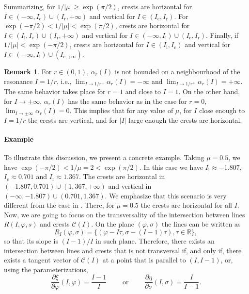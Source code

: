 \documentclass[a4paper,10pt]{article}
\newcommand{\NH}{\text{NHIM}}
\theoremstyle{definition}
\newtheorem{remark}[theorem]{Remark}
\begin{document}
Summarizing, for $1/\left|\mu\right| \geq \exp(\pi/2)$, crests are horizontal for $I\in\left(-\infty , I_{\text{c}}\right)\cup(I_{\text{r}} , +\infty)$ and vertical for $I\in\left(I_{\text{c}},I_{\text{r}}\right)$.
For $\exp(-\pi/2) < 1/\left|\mu\right| < \exp( \pi/2)$, crests are horizontal for $I\in(I_{\text{l}}, I_{\text{c}})\cup(I_{\text{r}} , +\infty)$ and vertical for $I\in(-\infty , I_{\text{l}})\cup(I_{\text{c}} , I_{\text{r}})$.
Finally, if $ 1/\left|\mu\right| < \exp( -\pi/2)$, crests are horizontal for $I\in(I_{\text{l}} , I_{\text{c}})$ and vertical for $I\in(-\infty , I_{\text{l}})\cup(I_{\text{c}, + \infty})$.

\begin{remark}
For $r\in (0,1)$, $\alpha_r(I)$ is not bounded on a neighbourhood of the resonance $I = 1/r$, i.e., $\lim_{I \rightarrow 1/r^{-}} \alpha_r(I) = -\infty $ and $\lim_{I\rightarrow 1/r^{+}}\alpha_r(I) = +\infty$.
The same behavior takes place for $r = 1$ and close to $I = 1$.
On the other hand, for $I\rightarrow \pm \infty$, $\alpha_r(I)$ has the same behavior as in the case for $r = 0$, $\lim_{I \rightarrow \pm\infty}\alpha_r(I) = 0$.
This implies that for any value of $\mu$, for $I$ close enough to $I = 1/r$ the crests are vertical, and for $\left|I\right| $ large enough the crests are horizontal. \label{rem:r_3}
\end{remark}

\paragraph{Example} To illustrate this discussion, we present a concrete example.
Taking $\mu = 0.5$,  we have $\exp(-\pi/2)< 1/\mu = 2<\exp(\pi/2)$.
In this case we have $I_{\text{l}}\approx -1.807$, $I_{\text{c}} \approx 0.701$ and $I_{\text{r}} \approx 1.367$.
The crests are horizontal in $(-1.807 , 0.701)\cup(1,367 , + \infty)$ and vertical in $(-\infty , -1.807)\cup( 0.701 , 1.367 )$.
We emphasize that this scenario is very different from the case in \cite{Delshams2017}.
There, for $\mu = 0.5$ the crests are horizontal for all $I$.
\\

Now, we are going to focus on the transversality of the intersection between {\NH} lines $R(I,\varphi , s)$ and crests $\mathcal{C}(I)$.
On the plane $(\varphi , \sigma)$ the {\NH} lines can be written as
\begin{equation}
R_{I}(\varphi, \sigma) = \{( \varphi - I\tau , \sigma -(I-1)\tau) , \tau\in\mathbb{R}\},\label{eq:nhim_line_sigma}
\end{equation}
so that its slope is $(I-1)/I$ in such plane.
Therefore, there exists an intersection between {\NH} lines and crests that is not transversal if, and only if, there exists a tangent vector of $\mathcal{C}(I)$ at a point that is parallel to $(I,I-1)$, or, using the parameterizations,
\begin{equation*}
\frac{\partial\xi}{\partial \varphi}(I,\varphi) = \frac{I-1}{I} \quad\quad\text{ or } \quad\quad \frac{\partial \eta}{\partial\sigma}(I,\sigma) = \frac{I}{I-1}.
\end{equation*}
\end{document}
